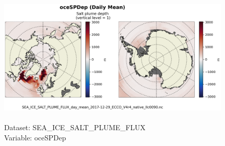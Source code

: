 \begin{figure}[H]
\centering
\includegraphics[scale=0.5]{../images/plots/native_plots/Sea-Ice_Salt_Plume_Fluxes/oceSPDep.png}
\caption{\\Dataset: SEA\_ICE\_SALT\_PLUME\_FLUX\\Variable: oceSPDep}
\label{tab:table-SEA_ICE_SALT_PLUME_FLUX_oceSPDep-Plot}
\end{figure}
\pagebreak
